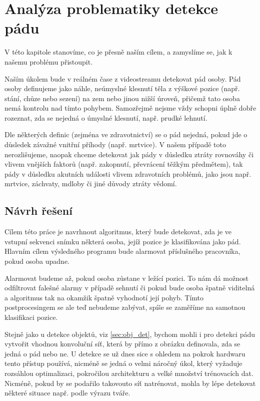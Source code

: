 \chapter{Analýza problematiky detekce pádu}
\label{chap:Goal}

V této kapitole stanovíme, co je přesně naším cílem, a zamyslíme se, jak k
našemu problému přistoupit.

Naším úkolem bude v reálném čase z videostreamu detekovat pád osoby. Pád osoby
definujeme jako náhle, neúmyslné klesnutí těla z výškové pozice (např. stání,
chůze nebo sezení) na zem nebo jinou nižší úroveň, přičemž tato osoba nemá
kontrolu nad tímto pohybem. Samozřejmě nejsme vždy schopni úplně dobře
rozeznat, zda se nejedná o úmyslné klesnutí, např. prudké lehnutí.

Dle některých definic (zejména ve zdravotnictví) se o pád nejedná, pokud jde o
důsledek závažné vnitřní příhody (např. mrtvice). V našem případě toto
nerozlišujeme, naopak chceme detekovat jak pády v důsledku ztráty rovnováhy či
vlivem vnějších faktorů (např. zakopnutí, převrácení těžkým předmětem), tak
pády v důsledku akutních události vlivem zdravotních problémů, jako jsou např.
mrtvice, záchvaty, mdloby či jiné důvody ztráty vědomí.

\section{Návrh řešení}

Cílem této práce je navrhnout algoritmus, který bude detekovat, zda je ve
vstupní sekvenci snímku některá osoba, jejíž pozice je klasifikována jako pád.
Hlavním cílem výsledného programu bude alarmovat příslušného pracovníka, pokud
osoba upadne.

Alarmovat budeme až, pokud osoba zůstane v ležící pozici. To nám dá možnost
odfiltrovat falešné alarmy v případě sehnutí či pokud bude osoba špatně
viditelná a algoritmus tak na okamžik špatně vyhodnotí její pohyb. Tímto
postprocesingem se ale teď nebudeme zabývat, spíše se zaměříme na samotnou
klasifikaci pozice.

Stejně jako u detekce objektů, viz \ref{sec:obj_det}, bychom mohli i pro
detekci pádu vytvořit vhodnou konvoluční síť, která by přímo z obrázku
definovala, zda se jedná o pád nebo ne. U detekce se už dnes sice s ohledem na
pokrok hardwaru tento přístup používá, nicméně se jedná o velmi náročný úkol,
který vyžaduje rozsáhlou optimalizaci, pokročilou architekturu a velké množství
trénovacích dat. Nicméně, pokud by se podařilo takovouto síť natrénovat, mohla
by lépe detekovat některé situace např. podle výrazu tváře.

